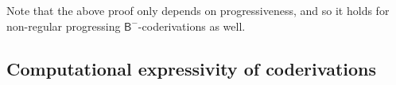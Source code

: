 \documentclass[manuscript,screen]{acmart}
\theoremstyle{definition}
\theoremstyle{remark}
\newcommand{\saferec}{\mathsf{srec}}
\newcommand{\bc}{\mathsf{B}}
\newcommand{\bcnorec}{\bc^{-}}
\begin{document}
Note that the above proof only depends on progressiveness, and so it holds for non-regular progressing $\bcnorec$-coderivations as well.





\subsection{Computational expressivity of coderivations} \label{subsec:definability in typing derivations.}



\end{document}
